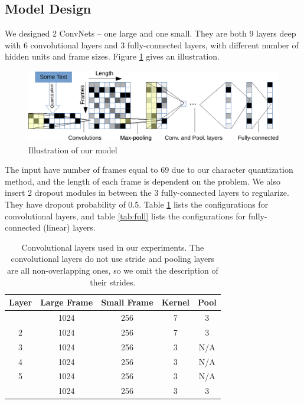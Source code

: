 \documentclass{article}
\begin{document}
\begin{CJK}{UTF8}{gbsn}
\subsection{Model Design}

We designed 2 ConvNets -- one large and one small. They are both 9 layers deep with 6 convolutional layers and 3 fully-connected layers, with different number of hidden units and frame sizes. Figure \ref{fig:modl} gives an illustration.

\begin{figure}[ht]
  \centering
  \includegraphics[width=\columnwidth]{model}
  \caption{Illustration of our model}
  \label{fig:modl}
\end{figure}

The input have number of frames equal to 69 due to our character quantization method, and the length of each frame is dependent on the problem. We also insert 2 dropout\cite{HSKSS12} modules in between the 3 fully-connected layers to regularize. They have dropout probability of 0.5. Table \ref{tab:conv} lists the configurations for convolutional layers, and table \ref{tab:full} lists the configurations for fully-connected (linear) layers.

\begin{table}[ht]
  \caption{Convolutional layers used in our experiments. The convolutional layers do not use stride and pooling layers are all non-overlapping ones, so we omit the description of their strides.}
  \label{tab:conv}
  \begin{center}
    \begin{tabular}{ccccc}
      \hline
      \abovespace\belowspace
      Layer & Large Frame & Small Frame & Kernel & Pool \\
      \hline
      \abovespace
      1 & 1024 & 256 & 7 & 3 \\
      2 & 1024 & 256 & 7 & 3 \\
      3 & 1024 & 256 & 3 & N/A \\
      4 & 1024 & 256 & 3 & N/A \\
      5 & 1024 & 256 & 3 & N/A \\
      \belowspace
      6 & 1024 & 256 & 3 & 3 \\
      \hline
    \end{tabular}
  \end{center}
\end{table}


\end{CJK}
\end{document}
